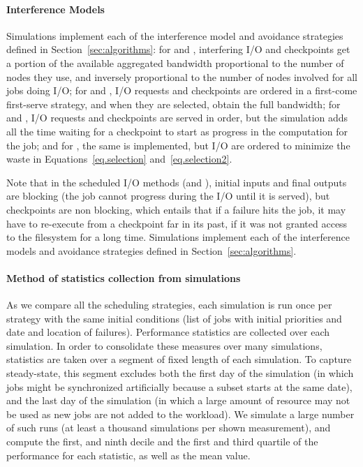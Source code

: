 \paragraph*{Interference Models} Simulations implement each of the
interference model and avoidance strategies defined in
Section~\ref{sec:algorithms}: for \propfixed and \propdaly,
interfering I/O and checkpoints get a portion of the available
aggregated bandwidth proportional to the number of nodes they use, and
inversely proportional to the number of nodes involved for all
jobs doing I/O; for \bfifofixed and \bfifodaly, I/O requests
and checkpoints are ordered in a first-come first-serve strategy, and
when they are selected, obtain the full bandwidth; for \fifofixed and
\fifodaly, I/O requests and checkpoints are served in order, but the
simulation adds all the time waiting for a checkpoint to start as
progress in the computation for the job; and for \cooperative,
the same is implemented, but I/O are ordered to minimize the waste in
Equations~\eqref{eq.selection} and~\eqref{eq.selection2}.

Note that in the scheduled I/O methods (\fifononblock and \cooperative),
initial inputs and final outputs are blocking (the job
cannot progress during the I/O until it is served), but checkpoints
are non blocking, which entails that if a failure hits the job,
it may have to re-execute from a checkpoint far in its past, if it was not
granted access to the filesystem for a long time.
\else
Simulations implement each of the interference models and avoidance
strategies defined in Section~\ref{sec:algorithms}.
\fi

\paragraph*{Method of statistics collection from simulations}
As we compare all the scheduling strategies, each simulation is run
once per strategy with the same initial conditions (list of jobs with
initial priorities and date and location of failures). Performance
statistics are collected over each simulation. In order to consolidate
these measures over many simulations, statistics are taken over a
segment of fixed length of each simulation.  To capture steady-state,
this segment excludes both the first day of the simulation (in which
jobs might be synchronized artificially because a subset
starts at the same date), and the last day of the simulation (in which
a large amount of resource may not be used as new jobs are not
added to the workload). We simulate a large number of such runs (at
least a thousand simulations per shown measurement), and compute the
first, and ninth decile and the first and third quartile of the
performance for each statistic, as well as the mean value.
